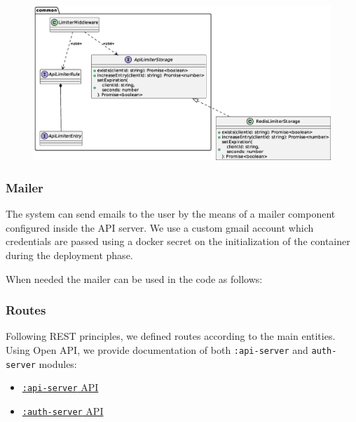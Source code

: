 \documentclass{scrartcl}
\begin{document}
\begin{figure}
    \centering
    \includegraphics[width=\linewidth]{figures/api-limiter-api.eps}
    \label{fig:api-limiter-api} 
\end{figure}

\subsubsection{Mailer}
The system can send emails to the user by the means of a mailer component configured inside the API server. 
We use a custom gmail account which credentials are passed using a docker secret on the initialization of the container during the deployment phase.

When needed the mailer can be used in the code as follows:



\subsubsection{Routes}

Following REST principles, we defined routes according to the main entities.
Using Open API, we provide documentation of both \texttt{:api-server} and \texttt{auth-server} modules:
\begin{itemize}
    \item \href{https://tassiluca.github.io/ChainVote/swagger-ui-api/}{\texttt{:api-server} API}
    \item \href{https://tassiluca.github.io/ChainVote/swagger-ui-auth/}{\texttt{:auth-server} API}
\end{itemize}
\end{document}
